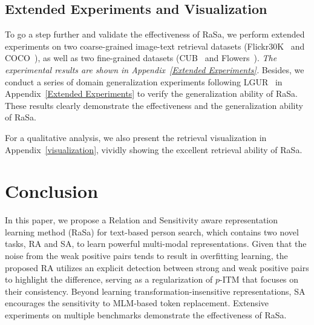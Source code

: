 \documentclass{article}
\begin{document}
\subsection{Extended Experiments and Visualization}



To go a step further and validate the effectiveness of RaSa, we perform extended experiments on two coarse-grained image-text retrieval datasets (Flickr30K~\cite{plummer2015flickr30k} and COCO~\cite{lin2014microsoft}), as well as two fine-grained datasets (CUB~\cite{reed2016learning} and Flowers~\cite{reed2016learning}). 
\emph{The experimental results are shown in Appendix~\ref{Extended Experiments}.}
Besides, we conduct a series of domain generalization experiments following LGUR~\cite{shao2022learning} in Appendix~\ref{Extended Experiments} to verify the generalization ability of RaSa. These results clearly demonstrate the effectiveness and the generalization ability of RaSa. 

For a qualitative analysis, we also present the retrieval visualization in Appendix~\ref{visualization}, vividly showing the excellent retrieval ability of RaSa.



\section{Conclusion}
In this paper, we propose a Relation and Sensitivity aware representation learning method (RaSa) for text-based person search, which contains two novel tasks, RA and SA, to learn powerful multi-modal representations. 
Given that the noise from the weak positive pairs tends to result in overfitting learning, the proposed RA utilizes an explicit detection between strong and weak positive pairs to highlight the difference, serving as a regularization of $p$-ITM that focuses on their consistency. 
Beyond learning transformation-insensitive representations, SA encourages the sensitivity to MLM-based token replacement.
Extensive experiments on multiple benchmarks demonstrate the effectiveness of RaSa.
\end{document}
